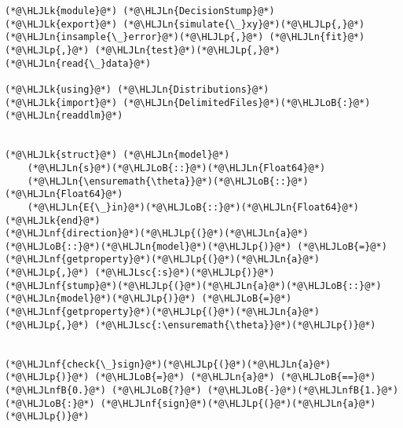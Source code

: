 \documentclass[12pt,a4paper]{article}
\newcommand{\HLJLk}[1]{\textcolor[RGB]{148,91,176}{\textbf{#1}}}
\newcommand{\HLJLn}[1]{#1}
\newcommand{\HLJLnf}[1]{\textcolor[RGB]{66,102,213}{#1}}
\newcommand{\HLJLsc}[1]{\textcolor[RGB]{201,61,57}{#1}}
\newcommand{\HLJLnfB}[1]{\textcolor[RGB]{59,151,46}{#1}}
\newcommand{\HLJLoB}[1]{\textcolor[RGB]{102,102,102}{\textbf{#1}}}
\newcommand{\HLJLp}[1]{#1}
\begin{document}
\begin{lstlisting}
(*@\HLJLk{module}@*) (*@\HLJLn{DecisionStump}@*)
(*@\HLJLk{export}@*) (*@\HLJLn{simulate{\_}xy}@*)(*@\HLJLp{,}@*) (*@\HLJLn{insample{\_}error}@*)(*@\HLJLp{,}@*) (*@\HLJLn{fit}@*)(*@\HLJLp{,}@*) (*@\HLJLn{test}@*)(*@\HLJLp{,}@*) (*@\HLJLn{read{\_}data}@*)

(*@\HLJLk{using}@*) (*@\HLJLn{Distributions}@*)
(*@\HLJLk{import}@*) (*@\HLJLn{DelimitedFiles}@*)(*@\HLJLoB{:}@*) (*@\HLJLn{readdlm}@*)


(*@\HLJLk{struct}@*) (*@\HLJLn{model}@*)
    (*@\HLJLn{s}@*)(*@\HLJLoB{::}@*)(*@\HLJLn{Float64}@*)
    (*@\HLJLn{\ensuremath{\theta}}@*)(*@\HLJLoB{::}@*)(*@\HLJLn{Float64}@*)
    (*@\HLJLn{E{\_}in}@*)(*@\HLJLoB{::}@*)(*@\HLJLn{Float64}@*)
(*@\HLJLk{end}@*)
(*@\HLJLnf{direction}@*)(*@\HLJLp{(}@*)(*@\HLJLn{a}@*)(*@\HLJLoB{::}@*)(*@\HLJLn{model}@*)(*@\HLJLp{)}@*) (*@\HLJLoB{=}@*) (*@\HLJLnf{getproperty}@*)(*@\HLJLp{(}@*)(*@\HLJLn{a}@*)(*@\HLJLp{,}@*) (*@\HLJLsc{:s}@*)(*@\HLJLp{)}@*)
(*@\HLJLnf{stump}@*)(*@\HLJLp{(}@*)(*@\HLJLn{a}@*)(*@\HLJLoB{::}@*)(*@\HLJLn{model}@*)(*@\HLJLp{)}@*) (*@\HLJLoB{=}@*) (*@\HLJLnf{getproperty}@*)(*@\HLJLp{(}@*)(*@\HLJLn{a}@*)(*@\HLJLp{,}@*) (*@\HLJLsc{:\ensuremath{\theta}}@*)(*@\HLJLp{)}@*)


(*@\HLJLnf{check{\_}sign}@*)(*@\HLJLp{(}@*)(*@\HLJLn{a}@*)(*@\HLJLp{)}@*) (*@\HLJLoB{=}@*) (*@\HLJLn{a}@*) (*@\HLJLoB{==}@*) (*@\HLJLnfB{0.}@*) (*@\HLJLoB{?}@*) (*@\HLJLoB{-}@*)(*@\HLJLnfB{1.}@*) (*@\HLJLoB{:}@*) (*@\HLJLnf{sign}@*)(*@\HLJLp{(}@*)(*@\HLJLn{a}@*)(*@\HLJLp{)}@*)



\end{lstlisting}
\end{document}
